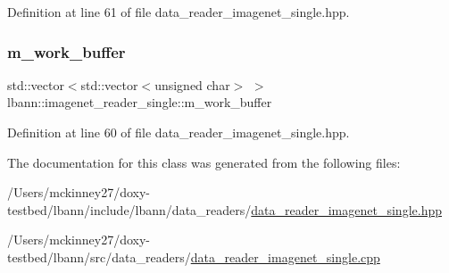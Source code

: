 Definition at line 61 of file data\+\_\+reader\+\_\+imagenet\+\_\+single.\+hpp.

\mbox{\label{classlbann_1_1imagenet__reader__single_a499b197f1d985b592801de9adfe2d2f5}} 
\subsubsection{\texorpdfstring{m\+\_\+work\+\_\+buffer}{m\_work\_buffer}}
{\footnotesize\ttfamily std\+::vector$<$std\+::vector$<$unsigned char$>$ $>$ lbann\+::imagenet\+\_\+reader\+\_\+single\+::m\+\_\+work\+\_\+buffer\hspace{0.3cm}{\ttfamily [private]}}



Definition at line 60 of file data\+\_\+reader\+\_\+imagenet\+\_\+single.\+hpp.



The documentation for this class was generated from the following files\+:\begin{DoxyCompactItemize}
\item 
/\+Users/mckinney27/doxy-\/testbed/lbann/include/lbann/data\+\_\+readers/\hyperlink{data__reader__imagenet__single_8hpp}{data\+\_\+reader\+\_\+imagenet\+\_\+single.\+hpp}\item 
/\+Users/mckinney27/doxy-\/testbed/lbann/src/data\+\_\+readers/\hyperlink{data__reader__imagenet__single_8cpp}{data\+\_\+reader\+\_\+imagenet\+\_\+single.\+cpp}\end{DoxyCompactItemize}
